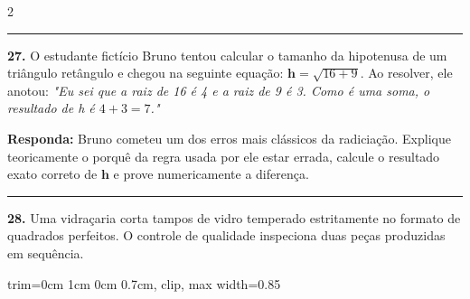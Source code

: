 \documentclass[twoside, 10pt, a4paper]{article}
\newlength{\espacoPreQuestao}\setlength{\espacoPreQuestao}{0.1cm}
\newlength{\espacoQuestao}\setlength{\espacoQuestao}{0.2cm}
\newcommand{\larguraTikz}{0.85\linewidth}
\begin{document}
\begin{multicols*}{2}
\noindent\textcolor{CorLinha}{\rule{\linewidth}{0.5pt}} 
\par\vspace{\espacoPreQuestao}
\textbf{27.} O estudante fictício Bruno tentou calcular o tamanho da hipotenusa de um triângulo retângulo e chegou na seguinte equação: $ \textbf{h} = \sqrt{16 + 9} $. Ao resolver, ele anotou: 
\textit{"Eu sei que a raiz de 16 é 4 e a raiz de 9 é 3. Como é uma soma, o resultado de h é $ 4 + 3 = 7 $."}
\begin{boxresponda}
\textbf{Responda:} Bruno cometeu um dos erros mais clássicos da radiciação. Explique teoricamente o porquê da regra usada por ele estar errada, calcule o resultado exato correto de $ \textbf{h} $ e prove numericamente a diferença.
\end{boxresponda}
\par\vspace{\espacoQuestao}

\noindent\textcolor{CorLinha}{\rule{\linewidth}{0.5pt}} 
\par\vspace{\espacoPreQuestao}
\textbf{28.} Uma vidraçaria corta tampos de vidro temperado estritamente no formato de quadrados perfeitos. O controle de qualidade inspeciona duas peças produzidas em sequência.
\begin{center}
\begin{adjustbox}{trim=0cm 1cm 0cm 0.7cm, clip, max width=\larguraTikz}
\end{adjustbox}
\end{center}
\end{multicols*}
\end{document}
